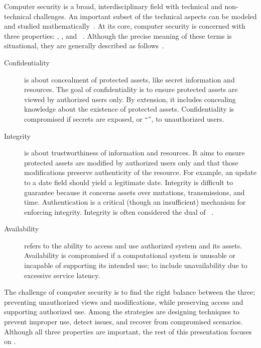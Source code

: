 Computer security is a broad, interdisciplinary field with technical and non-technical challenges.
An important subset of the technical aspects can be modeled and studied mathematically~\cite{piessens2024}.
At its core, computer security is concerned with three properties: , , and ~\cite{du2019}.
Although the precise meaning of these terms is situational, they are generally described as follows~\cite[p. 4--6]{bishop2003}.

\begin{description}
\item[Confidentiality]
is about concealment of protected assets, like secret information and resources.
The goal of confidentiality is to ensure protected assets are viewed by authorized users only.
By extension, it includes concealing knowledge about the existence of protected assets.
Confidentiality is compromised if secrets are exposed, or \enquote{}, to unauthorized users.

\item[Integrity]
is about trustworthiness of information and resources.
It aims to ensure protected assets are modified by authorized users only and that those modifications preserve authenticity of the resource.
For example, an update to a date field should yield a legitimate date.
Integrity is difficult to guarantee because it concerns assets over mutations, transmissions, and time.
Authentication is a critical (though an insufficient) mechanism for enforcing integrity.
Integrity is often considered the dual of ~\cite{biba1977}.

\item[Availability]
refers to the ability to access and use authorized system and its assets.
Availability is compromised if a computational system is unusable or incapable of supporting its intended use;
to include unavailability due to excessive service latency.

\end{description}
The challenge of computer security is to find the right balance between the three;
preventing unauthorized views and modifications, while preserving access and supporting authorized use.
Among the strategies are designing techniques to prevent improper use, detect issues, and recover from compromised scenarios.
Although all three properties are important, the rest of this presentation focuses on .

